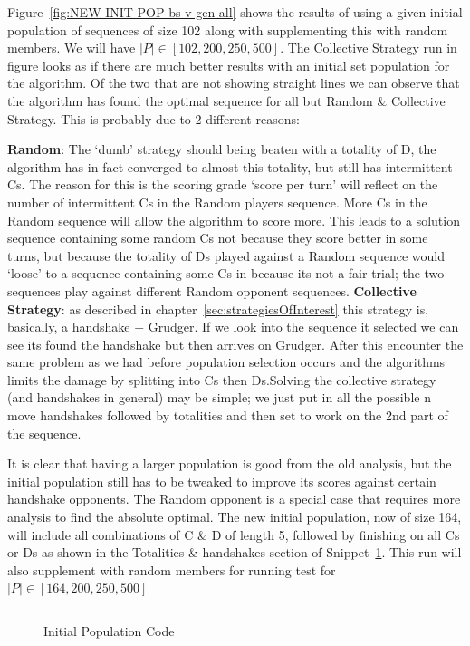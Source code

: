 Figure~\ref{fig:NEW-INIT-POP-bs-v-gen-all} shows the results of using a given initial population of sequences of size 102 along with supplementing this with random members.
We will have \(|P| \in [102,200,250,500]\).
The Collective Strategy run in figure looks as if there are much better results with an initial set population for the algorithm.
Of the two that are not showing straight lines we can observe that the algorithm has found the optimal sequence for all but Random \& Collective Strategy.
This is probably due to 2 different reasons:

\textbf{Random}: The `dumb' strategy should being beaten with a totality of D, the algorithm has in fact converged to almost this totality, but still has intermittent Cs.
The reason for this is the scoring grade `score per turn' will reflect on the number of intermittent Cs in the Random players sequence.
More Cs in the Random sequence will allow the algorithm to score more.
This leads to a solution sequence containing some random Cs not because they score better in some turns, but because the totality of Ds played against
a Random sequence would `loose' to a sequence containing some Cs in because its not a fair trial;
the two sequences play against different Random opponent sequences.
\textbf{Collective Strategy}: as described in chapter~\ref{sec:strategiesOfInterest} this strategy is, basically, a handshake + Grudger.
If we look into the sequence it selected we can see its found the handshake but then arrives on Grudger.
After this encounter the same problem as we had before population selection occurs and the algorithms limits the damage by splitting into Cs then Ds.Solving the collective strategy (and handshakes in general) may be simple;
we just put in all the possible n move handshakes followed by totalities and then set to work on the 2nd part of the sequence.

It is clear that having a larger population is good from the old analysis, but the initial population still has to be tweaked to improve its scores against certain handshake opponents.
The Random opponent is a special case that requires more analysis to find the absolute optimal.
The new initial population, now of size 164, will include all combinations of C \& D of length 5, followed by finishing on all Cs or Ds as shown in the Totalities \& handshakes section of Snippet~\ref{code:initialPopulationCode}.
This run will also supplement with random members for running test for \(|P| \in [164,200,250,500]\)

\begin{figure}
    \inputminted{python}{code_snippets/initialPopulationCode.py}
    \caption{Initial Population Code}\label{code:initialPopulationCode}
\end{figure}

